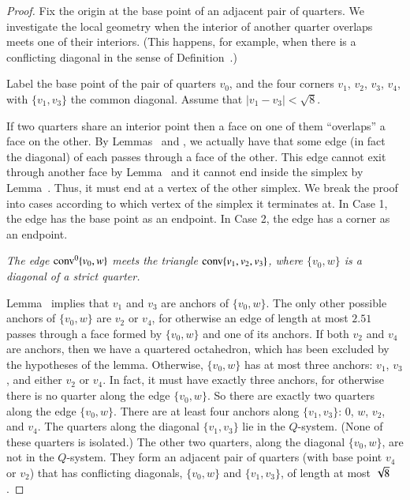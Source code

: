 \begin{proof}
Fix the origin at the base point of an adjacent pair of quarters.
We investigate the local geometry when the interior of another
quarter overlaps meets one of their interiors.  (This happens, for
example, when there is a conflicting diagonal in the sense of
Definition~.)

Label the base point of the pair of quarters $v_0$, and the four
corners  $v_1$, $v_2$, $v_3$, $v_4$, with $\{v_1,v_3\}$ the common
diagonal. Assume that $|v_1-v_3|<\sqrt8$.

If two quarters share an interior point then a face on one of them
``overlaps'' a face on the other.  By
Lemmas~ and , we
actually have that some edge (in fact the diagonal) of each passes
through a face of the other.  This edge cannot exit through
another face by Lemma~ and it cannot end
inside the simplex by Lemma~. Thus, it must
end at a vertex of the other simplex.  We break the proof into
cases according to which vertex of the simplex it terminates at.
In Case 1, the edge has the base point as an endpoint.  In Case 2,
the edge has a corner as an endpoint.

 {\it The edge ${\operatorname{conv}}^0\{v_0,w\}$ meets 
the
triangle ${\operatorname{conv}}\{v_1,v_2,v_3\}$, where $\{v_0,w\}$ is a diagonal of a
strict quarter.}

Lemma~ implies that $v_1$ and $v_3$ are
anchors of $\{v_0,w\}$. The only other possible anchors of $\{v_0,w\}$
are $v_2$ or $v_4$, for otherwise an edge of length at most $2.51$
passes through a face formed by $\{v_0,w\}$ and one of its anchors.
If both $v_2$ and $v_4$ are anchors, then we have a quartered
octahedron, which has been excluded by the hypotheses of the
lemma. Otherwise, $\{v_0,w\}$ has at most three anchors: $v_1$,
$v_3$, and either $v_2$ or $v_4$. In fact, it must have exactly
three anchors, for otherwise there is no quarter along the edge
$\{v_0,w\}$. So there are exactly two quarters along the edge
$\{v_0,w\}$. There are at least four anchors along $\{v_1,v_3\}$:
$0$, $w$, $v_2$, and $v_4$. The quarters along the diagonal
$\{v_1,v_3\}$ lie in the $Q$-system. (None of these quarters is
isolated.)  The other two quarters, along the diagonal $\{v_0,w\}$,
are not in the $Q$-system. They form an adjacent pair of quarters
(with base point $v_4$ or $v_2$) that has conflicting diagonals,
$\{v_0,w\}$ and $\{v_1,v_3\}$, of length at most $\sqrt8$.


\end{proof}
